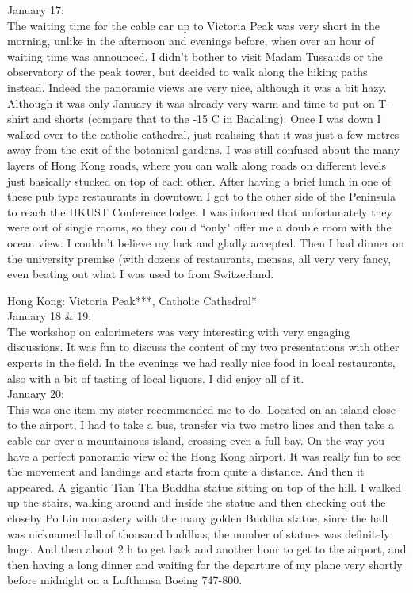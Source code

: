 January 17:\\
The waiting time for the cable car up to Victoria Peak was very short in the morning, unlike in the afternoon and evenings before, when over an hour of waiting time was announced. I didn't bother to visit Madam Tussauds or the observatory of the peak tower, but decided to walk along the hiking paths instead. Indeed the panoramic views are very nice, although it was a bit hazy. Although it was only January it was already very warm and time to put on T-shirt and shorts (compare that to the -15 C in Badaling). Once I was down I walked over to the catholic cathedral, just realising that it was just a few metres away from the exit of the botanical gardens. I was still confused about the many layers of Hong Kong roads, where you can walk along roads on different levels just basically stucked on top of each other. After having a brief lunch in one of these pub type restaurants in downtown I got to the other side of the Peninsula to reach the HKUST Conference lodge. I was informed that unfortunately they were out of single rooms, so they could ``only" offer me a double room with the ocean view. I couldn't believe my luck and gladly accepted. Then I had dinner on the university premise (with dozens of restaurants, mensas, all very very fancy, even beating out what I was used to from Switzerland.

Hong Kong: Victoria Peak***, Catholic Cathedral*\\

January 18 \& 19:\\
The workshop on calorimeters was very interesting with very engaging discussions. It was fun to discuss the content of my two presentations with other experts in the field. In the evenings we had really nice food in local restaurants, also with a bit of tasting of local liquors. I did enjoy all of it.\\

January 20:\\
This was one item my sister recommended me to do. Located on an island close to the airport, I had to take a bus, transfer via two metro lines and then take a cable car over a mountainous island, crossing even a full bay. On the way you have a perfect panoramic view of the Hong Kong airport. It was really fun to see the movement and landings and starts from quite a distance. And then it appeared. A gigantic Tian Tha Buddha statue sitting on top of the hill. I walked up the stairs, walking around and inside the statue and then checking out the closeby Po Lin monastery with the many golden Buddha statue, since the hall was nicknamed hall of thousand buddhas, the number of statues was definitely huge. And then about 2 h to get back and another hour to get to the airport, and then having a long dinner and waiting for the departure of my plane very shortly before midnight on a Lufthansa Boeing 747-800.\\

